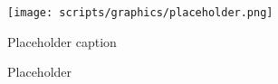 \begin{figure}[h]
  \centering
  \texttt{[image: scripts/graphics/placeholder.png]}
  \caption{Placeholder}{Placeholder caption}
\end{figure}
